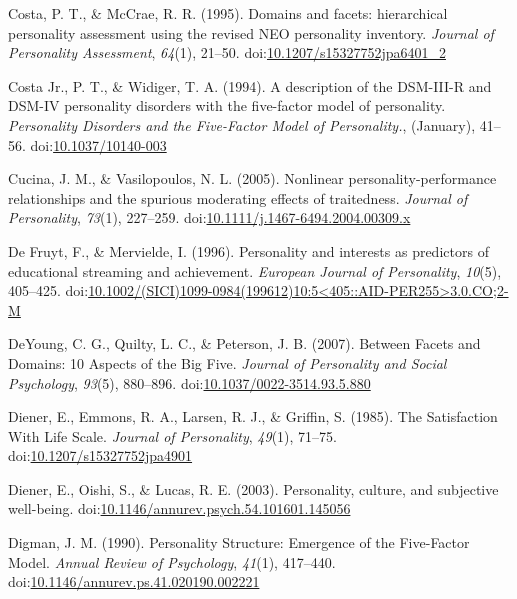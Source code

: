 \documentclass[,man]{apa6}
\theoremstyle{definition}
\theoremstyle{definition}
\theoremstyle{definition}
\theoremstyle{remark}
\begin{document}
\leavevmode\hypertarget{ref-Costa1995}{}%
Costa, P. T., \& McCrae, R. R. (1995). Domains and facets: hierarchical
personality assessment using the revised NEO personality inventory.
\emph{Journal of Personality Assessment}, \emph{64}(1), 21--50.
doi:\href{https://doi.org/10.1207/s15327752jpa6401_2}{10.1207/s15327752jpa6401\_2}

\leavevmode\hypertarget{ref-Widiger1994}{}%
Costa Jr., P. T., \& Widiger, T. A. (1994). A description of the
DSM-III-R and DSM-IV personality disorders with the five-factor model of
personality. \emph{Personality Disorders and the Five-Factor Model of
Personality.}, (January), 41--56.
doi:\href{https://doi.org/10.1037/10140-003}{10.1037/10140-003}

\leavevmode\hypertarget{ref-Cucina2005}{}%
Cucina, J. M., \& Vasilopoulos, N. L. (2005). Nonlinear
personality-performance relationships and the spurious moderating
effects of traitedness. \emph{Journal of Personality}, \emph{73}(1),
227--259.
doi:\href{https://doi.org/10.1111/j.1467-6494.2004.00309.x}{10.1111/j.1467-6494.2004.00309.x}

\leavevmode\hypertarget{ref-DeFruyt1996}{}%
De Fruyt, F., \& Mervielde, I. (1996). Personality and interests as
predictors of educational streaming and achievement. \emph{European
Journal of Personality}, \emph{10}(5), 405--425.
doi:\href{https://doi.org/10.1002/(SICI)1099-0984(199612)10:5\%3C405::AID-PER255\%3E3.0.CO;2-M}{10.1002/(SICI)1099-0984(199612)10:5\textless{}405::AID-PER255\textgreater{}3.0.CO;2-M}

\leavevmode\hypertarget{ref-DeYoung2007}{}%
DeYoung, C. G., Quilty, L. C., \& Peterson, J. B. (2007). Between Facets
and Domains: 10 Aspects of the Big Five. \emph{Journal of Personality
and Social Psychology}, \emph{93}(5), 880--896.
doi:\href{https://doi.org/10.1037/0022-3514.93.5.880}{10.1037/0022-3514.93.5.880}

\leavevmode\hypertarget{ref-Diener1985}{}%
Diener, E., Emmons, R. A., Larsen, R. J., \& Griffin, S. (1985). The
Satisfaction With Life Scale. \emph{Journal of Personality},
\emph{49}(1), 71--75.
doi:\href{https://doi.org/10.1207/s15327752jpa4901}{10.1207/s15327752jpa4901}

\leavevmode\hypertarget{ref-Diener2003}{}%
Diener, E., Oishi, S., \& Lucas, R. E. (2003). Personality, culture, and
subjective well-being.
doi:\href{https://doi.org/10.1146/annurev.psych.54.101601.145056}{10.1146/annurev.psych.54.101601.145056}

\leavevmode\hypertarget{ref-Digman1990}{}%
Digman, J. M. (1990). Personality Structure: Emergence of the
Five-Factor Model. \emph{Annual Review of Psychology}, \emph{41}(1),
417--440.
doi:\href{https://doi.org/10.1146/annurev.ps.41.020190.002221}{10.1146/annurev.ps.41.020190.002221}
\end{document}
